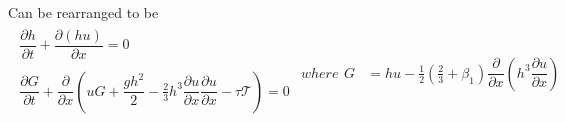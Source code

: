 \documentclass[10pt]{elsarticle}
\begin{document}
Can be rearranged to be
\begin{subequations}
	\begin{align}
	\begin{split}
	\dfrac{\partial h}{\partial t} + \dfrac{\partial (hu)}{\partial x} = 0
	\label{eq:gSGNh_G}
	\end{split}\\                                                                                                                                               
	\begin{split}
	\dfrac{\partial G }{\partial t}  + \dfrac{\partial}{\partial x} \left ( uG + \dfrac{gh^2}{2} - \frac{2}{3} h^3\dfrac{\partial u}{\partial x}\dfrac{\partial u}{\partial x}  - \tau \mathcal{T} \right) = 0
	\label{eq:gSGNuh_G}
	\end{split}\\
	\end{align}
	where
	\begin{align}
	G &= hu - \frac{1}{2}\left(\frac{2}{3} + \beta_1\right) \dfrac{\partial }{\partial x} \left ( h^3 \dfrac{\partial u}{\partial x} \right )
	\end{align}
\end{subequations}
\end{document}
